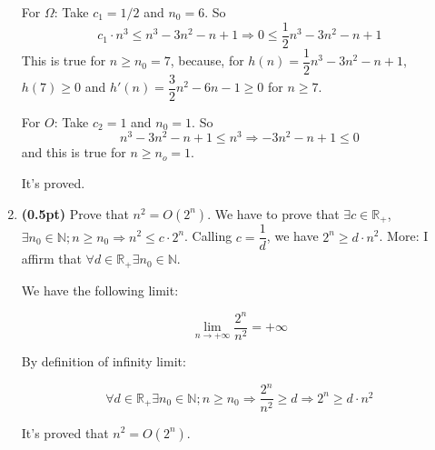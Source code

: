 \documentclass{article}
\begin{document}
\begin{enumerate}[label=\Alph*]
  For $\Omega$: Take $c_1 = 1/2$ and $n_0 = 6$. So
  $$c_1 \cdot n^3 \le n^3 -3n^2 - n + 1 \Rightarrow 0 \le \dfrac{1}{2}n^3 - 3n^2 - n + 1$$
  This is true for $n\ge n_0=7$, because, for $h(n) = \dfrac{1}{2}n^3 - 3n^2 - n + 1$, $h(7) \ge 0$ and $h'(n) = \dfrac{3}{2}n^2-6n-1 \ge 0$ for $n\ge 7$.
  
  For $O$: Take $c_2 = 1$ and $n_0 = 1$. So
  $$n^3 - 3n^2-n+1\le n^3 \Rightarrow -3n^2-n+1\le0$$
  and this is true for $n\ge n_o=1$.
  
  It's proved.
  \bigbreak
  \item \textbf{(0.5pt)} Prove that $n^2 = O(2^n)$.
  \bigbreak
  We have to prove that
  $\exists c \in \mathbb{R}_+$, $\exists n_0 \in \mathbb{N}; n\ge n_0 \Rightarrow n^2 \le c\cdot2^n$. Calling $c = \dfrac{1}{d}$, we have $2^n\ge d\cdot n^2$.
    More: I affirm that $\forall d \in \mathbb{R}_+ \exists n_0 \in \mathbb{N}$.
    
    We have the following limit:
    
    $$\lim_{n\to+\infty} \dfrac{2^n}{n^2} = +\infty$$
    
    By definition of infinity limit:
    
    $$\forall d \in \mathbb{R}_+ \exists n_0 \in \mathbb{N}; n \ge n_0 \Rightarrow \dfrac{2^n}{n^2} \ge d \Rightarrow 2^n \ge d\cdot n^2$$
    
    It's proved that $n^2 = O(2^n)$.
  
\end{enumerate}
\end{document}
